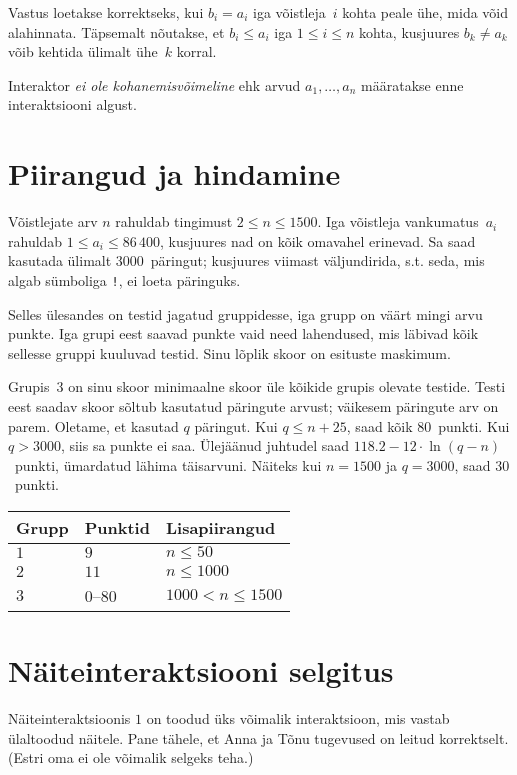 Vastus loetakse korrektseks, kui $b_i=a_i$ iga võistleja~$i$ kohta peale ühe, mida võid alahinnata.
Täpsemalt nõutakse, et $b_i\leq a_i$ iga $1\leq i\leq n$ kohta, kusjuures $b_k \neq a_k$ võib kehtida ülimalt ühe~$k$ korral.

Interaktor \emph{ei ole kohanemisvõimeline} ehk arvud $a_1, \ldots, a_n$ määratakse enne interaktsiooni algust.

\section*{Piirangud ja hindamine}

Võistlejate arv $n$ rahuldab tingimust
$2\leq n\leq 1500$. %
Iga võistleja vankumatus~$a_i$ rahuldab
$1\leq a_i\leq 86\,400$, %
kusjuures nad on kõik omavahel erinevad. %
Sa saad kasutada
ülimalt $3000$~päringut; %
kusjuures viimast väljundirida, s.t. seda, mis algab sümboliga \texttt{!}, ei loeta päringuks.

Selles ülesandes on testid jagatud gruppidesse, iga grupp on väärt mingi arvu punkte.
Iga grupi eest saavad punkte vaid need lahendused, mis läbivad kõik sellesse gruppi kuuluvad testid.
Sinu lõplik skoor on esituste maskimum.

Grupis~$3$ on sinu skoor minimaalne skoor üle kõikide grupis olevate testide.
Testi eest saadav skoor sõltub kasutatud päringute arvust;
väikesem päringute arv on parem.
Oletame, et kasutad $q$ päringut.
Kui $q \le n+25$, saad kõik $80$~punkti.
Kui $q > 3000$, siis sa punkte ei saa.
Ülejäänud juhtudel saad
$118.2 - 12 \cdot \ln(q - n)$~punkti, ümardatud lähima täisarvuni. %
Näiteks kui $n = 1500$ ja $q = 3000$, saad $30$~punkti.

\medskip
\begin{tabular}{lll}
Grupp & Punktid & Lisapiirangud \\\hline
$1$  &  $9$ & $n\leq 50$\\
$2$  &  $11$ & $n\leq 1000$\\
$3$  &  $0$--$80$ & $1000 < n\leq 1500$\\
\end{tabular}

\section*{Näiteinteraktsiooni selgitus}

Näiteinteraktsioonis $1$ on toodud üks võimalik interaktsioon, mis vastab
ülaltoodud näitele.
Pane tähele, et Anna ja Tõnu tugevused on leitud korrektselt.
(Estri oma ei ole võimalik selgeks teha.)
